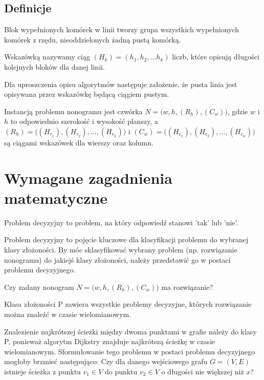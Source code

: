 \subsection{Definicje}
\begin{definition}
    Blok wypełnionych komórek w linii tworzy grupa wszystkich wypełnionych komórek z rzędu,
nieoddzielonych żadną pustą komórką.
\end{definition}
\begin{definition}
    Wskazówką nazywamy ciąg $(H_k) = (h_1, h_2, \ldots h_k)$ liczb, które opisują długości kolejnych
bloków dla danej linii.
\end{definition}
\begin{remark}
    Dla uproszczenia opisu algorytmów następuje założenie, że pusta linia jest opisywana przez
wskazówkę będącą ciągiem pustym.
\end{remark}
\begin{definition}
    Instancją problemu nonogramu jest czwórka $N = \big(w, h, (R_h), (C_w)\big)$, gdzie $w$ i $h$ 
to odpowiednio szerokość i wysokość planszy, a 
$(R_h) = \big((H_{r_1}), (H_{r_2}), \ldots, (H_{r_h})\big)$ i  
$(C_w) = \big((H_{c_1}), (H_{c_2}), \ldots, (H_{c_w})\big)$
są ciągami wskazówek dla wierszy oraz kolumn.
\end{definition}



\section{Wymagane zagadnienia matematyczne}


\begin{definition}
    Problem decyzyjny to problem, na który odpowiedź stanowi 'tak' lub 'nie'.
\end{definition}
    Problem decyzyjny to pojęcie kluczowe dla klasyfikacji problemu do wybranej klasy złożoności.
By móc sklasyfikować wybrany problem (np. rozwiązanie nonogramu) do jakiejś klasy złożoności,
należy przedstawić go w postaci problemu decyzyjnego.
\begin{example}
    Czy zadany nonogram $N = \big(w, h, (R_h), (C_w)\big)$ ma rozwiązanie?
\end{example}


\begin{definition}
    Klasa złożoności P zawiera wszystkie problemy decyzyjne, których rozwiązanie można znaleźć w czasie wielomianowym.
\end{definition}
\begin{example}
    Znalezienie najkrótszej ścieżki między dwoma punktami w grafie należy do klasy P, ponieważ
algorytm Dijkstry znajduje najkrótszą ścieżkę w czasie wielomianowym. Sformułowanie tego problemu
w postaci problemu decyzyjnego mogłoby brzmieć następująco: Czy dla danego wejściowego grafu $G = (V, E)$
istnieje ścieżka z punktu $v_1 \in V$ do punktu $v_2 \in V$ o długości nie większej niż $x$?
\end{example}


